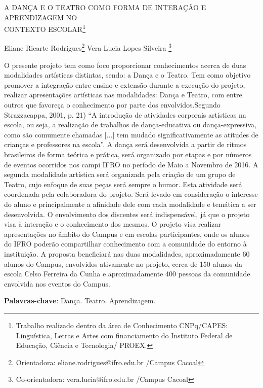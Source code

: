 \documentclass[article,12pt,onesidea,4paper,english,brazil]{abntex2}
\begin{document}
	
	
	\frenchspacing 
	
	\begin{center}
		\LARGE A DANÇA E O TEATRO COMO FORMA DE INTERAÇÃO E APRENDIZAGEM NO \\CONTEXTO ESCOLAR\footnote{Trabalho realizado dentro da área de Conhecimento CNPq/CAPES: Linguística, Letras e Artes com financiamento do Instituto Federal de Educação, Ciência e Tecnologia/ PROEX.}
		
		\normalsize
		Eliane Ricarte Rodrigues\footnote{Orientadora: eliane.rodrigues@ifro.edu.br /Campus Cacoal} 
		Vera Lucia Lopes Silveira \footnote{Co-orientadora: vera.lucia@ifro.edu.br /Campus Cacoal} 
		 
	\end{center}
	
	\noindent O presente projeto tem como foco proporcionar conhecimentos acerca de duas modalidades artísticas distintas, sendo: a Dança e o Teatro. Tem como objetivo promover a integração entre ensino e extensão durante a execução do projeto, realizar apresentações artísticas nas modalidades: Dança e Teatro, com entre outros que favoreça o conhecimento por parte dos envolvidos.Segundo Strazzacappa, 2001, p. 21) “A introdução de atividades corporais artísticas na escola, ou seja, a realização de trabalhos de dança-educativa ou dança-expressiva, como são comumente chamadas [...] tem mudado significativamente as atitudes de crianças e professores na escola”.
	A dança será desenvolvida a partir de ritmos brasileiros de forma teórica e prática, será organizado por etapas e por números de eventos ocorridos nos campi IFRO no período de Maio a Novembro de 2016.  A segunda modalidade artística será organizada pela criação de um grupo de Teatro, cujo enfoque de suas peças será sempre o humor. Esta atividade será coordenada pela colaboradora do projeto. Será levado em consideração o interesse do aluno e principalmente a afinidade dele com cada modalidade e temática a ser desenvolvida. O envolvimento dos discentes será indispensável, já que o projeto visa à interação e o conhecimento dos mesmos. O projeto visa realizar apresentações no âmbito do Campus e em escolas participantes, onde os alunos do IFRO poderão compartilhar conhecimento com a comunidade do entorno à instituição. A proposta beneficiará nas duas modalidades, aproximadamente 60 alunos do Campus, envolvidos ativamente no projeto, cerca de 150 alunos da escola Celso Ferreira da Cunha e aproximadamente 400 pessoas da comunidade envolvida nos eventos do Campus.
	
	\vspace{\onelineskip}
	
	\noindent
	\textbf{Palavras-chave}: Dança. Teatro. Aprendizagem.
	
\end{document}

